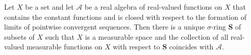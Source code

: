 Let $X$ be a set and let $\mathcal{A}$ be a real algebra of real-valued functions on $X$ that contains the constant functions and is closed with respect to the formation of limits of pointwise convergent sequences. Then there is a unique $\sigma$-ring $\mathbf{S}$ of subsets of $X$ such that $X$ is a measurable space and the collection of all real-valued measurable functions on $X$ with respect to $\mathbf{S}$ coincides with $\mathcal{A}$.
